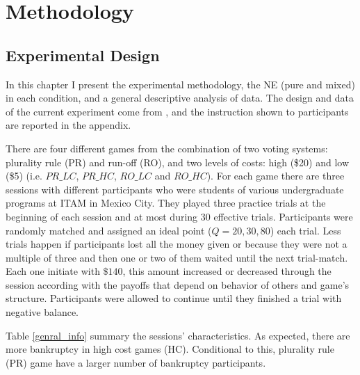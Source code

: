 \chapter{Methodology}

\section{Experimental Design}

In this chapter I present the experimental methodology, the NE (pure and mixed) in each condition, and a general descriptive analysis of data.
The design and data of the current experiment come from , and the instruction shown to participants are reported in the appendix.

There are four different games from the combination of two voting systems: plurality rule (PR) and run-off (RO), and two levels of costs: high (\$20) and low (\$5)
(i.e. $PR\_LC$, $PR\_HC$, $RO\_LC$ and $RO\_HC$). 
For each game there are three sessions with different participants who were students of various undergraduate programs at ITAM in Mexico City. They played three practice trials at the beginning of each session and at most during 30 effective trials.
Participants were randomly matched and assigned an ideal point ($Q={20, 30,80}$) each trial. 
Less trials happen if participants lost all the money given or because they were not a multiple of three and then one or two of them waited until the next trial-match. 
Each one initiate with $\$140$, this amount increased or decreased through the session according with the payoffs that depend on behavior of others and game's structure. Participants were allowed to continue until they finished a trial with negative balance. 

Table \ref{genral_info} summary the sessions' characteristics. 
As expected, there are more bankruptcy in high cost games (HC). Conditional to this, plurality rule (PR) game have a larger number of bankruptcy participants.


